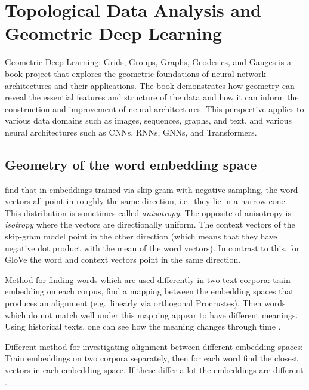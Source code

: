 \documentclass[11pt, a4paper]{amsart}
\begin{document}
\section{Topological Data Analysis and Geometric Deep Learning}

Geometric Deep Learning: Grids, Groups, Graphs, Geodesics, and Gauges is a book project \cite{bronstein2021geometric} that explores the geometric foundations of neural network architectures and their applications.
The book demonstrates how geometry can reveal the essential features and structure of the data and how it can inform the construction and improvement of neural architectures.
This perspective applies to various data domains such as images, sequences, graphs, and text, and various neural architectures such as CNNs, RNNs, GNNs, and Transformers.


\subsection{Geometry of the word embedding space}

\cite{mimno-thompson-2017-strange} find that in embeddings trained via skip-gram with negative sampling, the word vectors all point in roughly the same direction, i.e.\ they lie in a narrow cone.
This distribution is sometimes called \emph{anisotropy}.
The opposite of anisotropy is \emph{isotropy} where the vectors are directionally uniform.
The context vectors of the skip-gram model point in the other direction (which means that they have negative dot product with the mean of the word vectors).
In contrast to this, for GloVe the word and context vectors point in the same direction.

Method for finding words which are used differently in two text corpora:
train embedding on each corpus, find a mapping between the embedding spaces that produces an alignment (e.g.\ linearly via orthogonal Procrustes).
Then words which do not match well under this mapping appear to have different meanings.
Using historical texts, one can see how the meaning changes through time \cite{hamilton-etal-2016-diachronic}.

Different method for investigating alignment between different embedding spaces:
Train embeddings on two corpora separately, then for each word find the closest vectors in each embedding space.
If these differ a lot the embeddings are different \cite{gonen-etal-2020-simple}.
\end{document}
